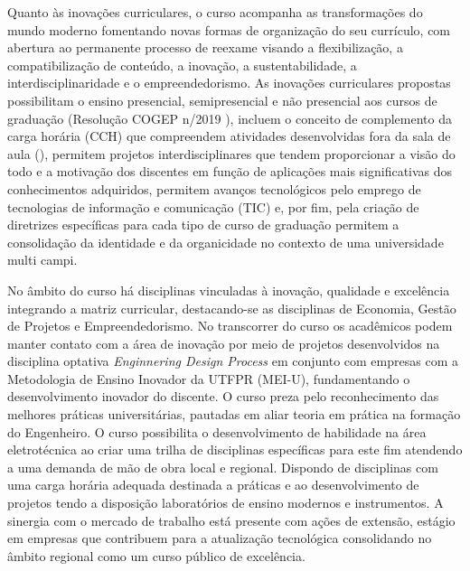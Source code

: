 Quanto às inovações curriculares, o curso acompanha as transformações do mundo moderno fomentando novas formas de organização do seu currículo, com abertura ao permanente processo de reexame visando a flexibilização, a compatibilização de conteúdo, a inovação, a sustentabilidade, a interdisciplinaridade e o empreendedorismo.  As inovações curriculares propostas possibilitam o ensino presencial, semipresencial e não presencial aos cursos de graduação (Resolução COGEP n/2019 \cite{cogep90}), incluem o conceito de complemento da carga horária (CCH) que compreendem atividades desenvolvidas fora da sala de aula (), permitem projetos interdisciplinares que tendem proporcionar a visão do todo e a motivação dos discentes em função de aplicações mais significativas dos conhecimentos adquiridos, permitem avanços tecnológicos pelo emprego de tecnologias de informação e comunicação (TIC) e, por fim, pela criação de diretrizes específicas para cada tipo de curso de graduação permitem a consolidação da identidade e da organicidade no contexto de uma universidade multi campi.


No âmbito do curso há disciplinas vinculadas à inovação, qualidade e excelência integrando a matriz curricular, destacando-se as disciplinas de Economia, Gestão de Projetos e Empreendedorismo. No transcorrer do curso os acadêmicos podem manter contato com a área de inovação por meio de projetos desenvolvidos na disciplina optativa \textit{Enginnering Design Process} em conjunto com empresas com a Metodologia de Ensino Inovador da UTFPR (MEI-U), fundamentando o desenvolvimento inovador do discente. O curso preza pelo reconhecimento das melhores práticas universitárias, pautadas em aliar teoria em prática na formação do Engenheiro.  O curso possibilita o desenvolvimento de habilidade na área eletrotécnica ao criar uma trilha de disciplinas específicas para este fim atendendo a uma demanda de mão de obra local e regional. Dispondo de disciplinas com uma carga horária adequada destinada a práticas e ao desenvolvimento de projetos tendo a disposição laboratórios de ensino modernos e instrumentos. A sinergia com o mercado de trabalho está presente com ações de extensão, estágio em empresas que contribuem para a atualização tecnológica consolidando no âmbito regional como um curso público de excelência.

